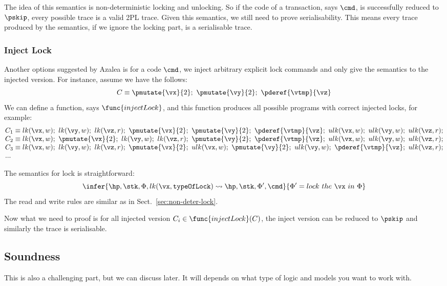 The idea of this semantics is non-deterministic locking and unlocking.
So if the code of a transaction, says \( \cmd \), is successfully reduced to \( \pskip \), every possible trace is a valid 2PL trace.
Given this semantics, we still need to prove serialisability.
This means every trace produced by the semantics, if we ignore the locking part, is a serialisable trace.

\subsubsection{Inject Lock}
Another options suggested by Azalea is for a code \( \cmd \), we inject arbitrary explicit lock commands and only give the semantics to the injected version.
For instance, assume we have the follows:
\[
    C \equiv \pmutate{\vx}{2} ;\  \pmutate{\vy}{2} ;\  \pderef{\vtmp}{\vz}
\]
We can define a function, says \( \func{injectLock} \), and this function produces all possible programs with correct injected locks, for example:
\[
    \begin{array}{@{}l@{}}
        C_1 \equiv lk(\vx, w);\ lk(\vy,w);\ lk(\vz,r);\ \pmutate{\vx}{2};\ \pmutate{\vy}{2};\ \pderef{\vtmp}{\vz};\ ulk(\vx, w);\ ulk(\vy,w);\ ulk(\vz,r); \\
        C_2 \equiv lk(\vx, w);\ \pmutate{\vx}{2};\ lk(\vy,w);\ lk(\vz,r);\ \pmutate{\vy}{2};\ \pderef{\vtmp}{\vz};\ ulk(\vx, w);\ ulk(\vy,w);\ ulk(\vz,r); \\
        C_3 \equiv lk(\vx, w);\ lk(\vy,w);\ lk(\vz,r);\ \pmutate{\vx}{2};\ ulk(\vx, w);\ \pmutate{\vy}{2};\ ulk(\vy,w);\ \pderef{\vtmp}{\vz};\ ulk(\vz,r); \\
        ... \\
    \end{array} 
\]

The semantics for lock is straightforward:
\[
    \infer{%
        \hp, \stk, \Phi, lk(\vx,\texttt{typeOfLock}) \leadsto \hp, \stk, \Phi', \cmd
    }{%
        \Phi' = lock \ the \ \vx \ in \  \Phi
    }
\]
The read and write rules are similar as in Sect.\ \ref{sec:non-deter-lock}.

Now what we need to proof is for all injected version \( C_i \in \func{injectLock}(C) \), the inject version can be reduced to \( \pskip \) and similarly the trace is serialisable.

\subsection{Soundness}
This is also a challenging part, but we can discuss later.
It will depends on what type of logic and models you want to work with.

